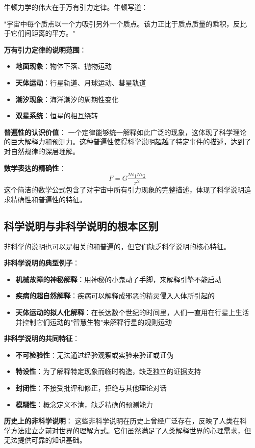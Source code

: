 \begin{examplebox}[title=牛顿万有引力定律的说明力量]
牛顿力学的伟大在于万有引力定律。牛顿写道：

"宇宙中每个质点以一个力吸引另外一个质点。该力正比于质点质量的乘积，反比于它们间距离的平方。"

\textbf{万有引力定律的说明范围}：
\begin{itemize}
\item \textbf{地面现象}：物体下落、抛物运动
\item \textbf{天体运动}：行星轨道、月球运动、彗星轨道
\item \textbf{潮汐现象}：海洋潮汐的周期性变化
\item \textbf{双星系统}：恒星的相互绕转
\end{itemize}

\textbf{普遍性的认识价值}：
一个定律能够统一解释如此广泛的现象，这体现了科学理论的巨大解释力和预测力。这种普遍性使得科学说明超越了特定事件的描述，达到了对自然规律的深层理解。

\textbf{数学表达的精确性}：
$$F = G\frac{m_1 m_2}{r^2}$$
这个简洁的数学公式包含了对宇宙中所有引力现象的完整描述，体现了科学说明追求精确性和普遍性的特征。
\end{examplebox}

\subsection{科学说明与非科学说明的根本区别}

\begin{theorembox}[title=非科学说明的特征分析]
非科学的说明也可以是相关的和普遍的，但它们缺乏科学说明的核心特征。

\textbf{非科学说明的典型例子}：
\begin{itemize}
\item \textbf{机械故障的神秘解释}：用神秘的小鬼动了手脚，来解释引擎不能启动
\item \textbf{疾病的超自然解释}：疾病可以解释成邪恶的精灵侵入人体所引起的
\item \textbf{天体运动的拟人化解释}：在长达数个世纪的时间里，人们一直用在行星上生活并控制它们运动的"智慧生物"来解释行星的规则运动
\end{itemize}

\textbf{非科学说明的共同特征}：
\begin{itemize}
\item \textbf{不可检验性}：无法通过经验观察或实验来验证或证伪
\item \textbf{特设性}：为了解释特定现象而临时构造，缺乏独立的证据支持
\item \textbf{封闭性}：不接受批评和修正，拒绝与其他理论对话
\item \textbf{模糊性}：概念定义不清，缺乏精确的预测能力
\end{itemize}

\textbf{历史上的非科学说明}：
这些非科学说明在历史上曾经广泛存在，反映了人类在科学方法建立之前对世界的理解方式。它们虽然满足了人类解释世界的心理需求，但无法提供可靠的知识基础。
\end{theorembox}

